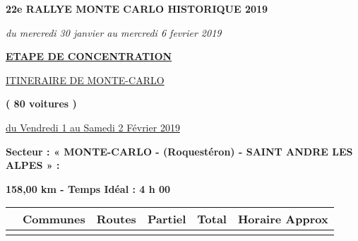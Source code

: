 \documentclass{article}%
\begin{document}
%
\normalsize%
\begin{center} \textbf{\LARGE{22e RALLYE MONTE CARLO HISTORIQUE 2019}} \end{center}%
\begin{flushleft} \textit{du mercredi 30 janvier au mercredi 6 fevrier 2019} \end{flushleft}%
\begin{center} \textbf{\underline{ETAPE DE CONCENTRATION}} \end{center}%
\begin{center} \underline{ITINERAIRE DE MONTE-CARLO} \end{center}%
\begin{center} \textbf{( 80 voitures )} \end{center}%
\begin{flushright} \underline{du Vendredi 1 au Samedi 2 Février 2019} \end{flushright}%
\begin{flushleft} \textbf{Secteur : « MONTE-CARLO - (Roquestéron) - SAINT ANDRE LES ALPES » :
} \end{flushleft}%
\begin{flushright} \textbf{158,00 km - Temps Idéal : 4 h 00
} \end{flushright}%
\begin{longtable}{p{2.25cm}|p{7.0cm}|p{1.5cm}|p{1.5cm}|p{1.5cm}|p{3.5cm}}%
\hline%
&Communes&Routes&Partiel&Total&Horaire Approx\\%
\hline%
\endhead%
\endfoot%
\endlastfoot%
\hline%
\end{longtable}%
\end{document}
